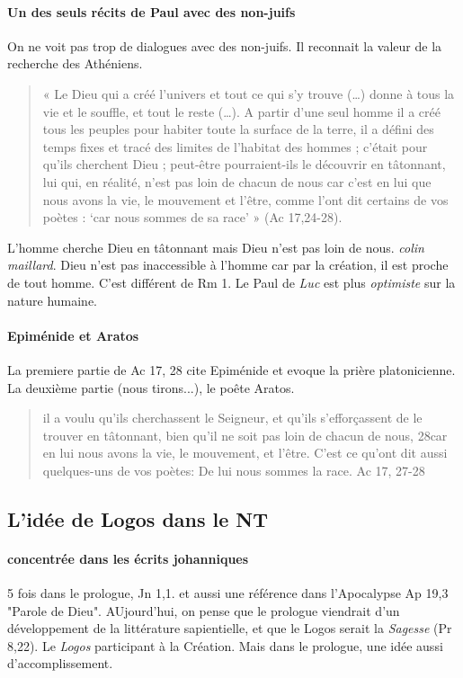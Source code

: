  \paragraph{Un des seuls récits de Paul avec des non-juifs} On ne voit pas trop de dialogues avec des non-juifs. Il reconnait la valeur de la recherche des Athéniens.
\begin{quote}
    
« Le Dieu qui a créé l’univers et tout ce qui s’y trouve (…) donne à tous la vie et le souffle, et
tout le reste (…). A partir d’une seul homme il a créé tous les peuples pour habiter toute la
surface de la terre, il a défini des temps fixes et tracé des limites de l’habitat des hommes ;
c’était pour qu’ils cherchent Dieu ; peut-être pourraient-ils le découvrir en tâtonnant, lui qui,
en réalité, n’est pas loin de chacun de nous car c’est en lui que nous avons la vie, le
mouvement et l’être, comme l’ont dit certains de vos poètes : ‘car nous sommes de sa race’ »
(Ac 17,24-28).
\end{quote}
 L'homme cherche Dieu en tâtonnant mais Dieu n'est pas loin de nous. \textit{colin maillard}. Dieu n'est pas inaccessible à l'homme car par la création, il est proche de tout homme. C'est différent de Rm 1. Le Paul de \textit{Luc} est plus \textit{optimiste} sur la nature humaine. 
 
\paragraph{Epiménide et Aratos} La premiere partie de Ac 17, 28 cite Epiménide et evoque la prière platonicienne. La deuxième partie (nous tirons...), le poête Aratos.
\begin{quote}
    
     il a voulu qu'ils cherchassent le Seigneur, et qu'ils s'efforçassent de le trouver en tâtonnant, bien qu'il ne soit pas loin de chacun de nous, 28car en lui nous avons la vie, le mouvement, et l'être. C'est ce qu'ont dit aussi quelques-uns de vos poètes: De lui nous sommes la race. Ac 17, 27-28
\end{quote}

\subsection{L’idée de Logos dans le NT}

 \paragraph{concentrée dans les écrits johanniques} 5 fois dans le prologue, Jn 1,1. et aussi une référence dans l'Apocalypse Ap 19,3 "Parole de Dieu". AUjourd'hui, on pense que le prologue viendrait d'un développement de la littérature sapientielle, et que le Logos serait la \textit{Sagesse} (Pr 8,22). Le \textit{Logos} participant à la Création.  Mais dans le prologue, une idée aussi d'accomplissement.


